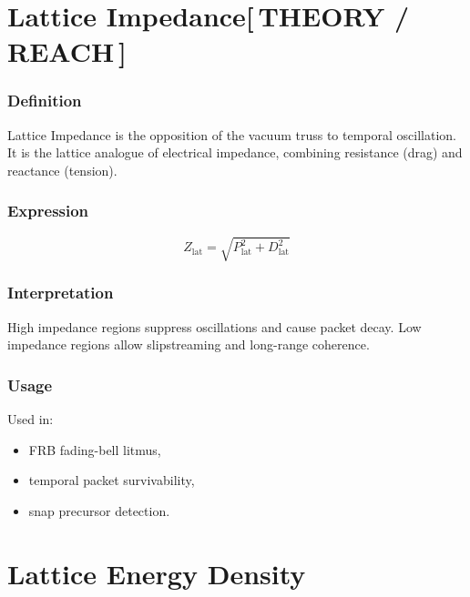 \documentclass[12pt,oneside]{book}
\newcommand{\TheoryTag}{\;\colorbox{theorytag!15}{\textcolor{theorytag}{\footnotesize\bfseries [\,THEORY / REACH\,]}}}
\begin{document}

\section{Lattice Impedance\TheoryTag}

\subsubsection{Definition}
Lattice Impedance is the opposition of the vacuum truss to temporal oscillation. It is the lattice
analogue of electrical impedance, combining resistance (drag) and reactance (tension).

\subsubsection{Expression}


\[
Z_{\mathrm{lat}} = \sqrt{P_{\mathrm{lat}}^2 + D_{\mathrm{lat}}^2}
\]



\subsubsection{Interpretation}
High impedance regions suppress oscillations and cause packet decay.  
Low impedance regions allow slipstreaming and long-range coherence.

\subsubsection{Usage}
Used in:
\begin{itemize}
    \item FRB fading-bell litmus,
    \item temporal packet survivability,
    \item snap precursor detection.
\end{itemize}


\section{Lattice Energy Density}
\end{document}
